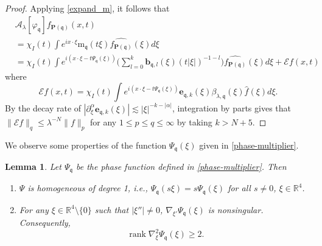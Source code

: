 \documentclass[10pt] %
{amsart}
\theoremstyle{plain}
\newtheorem{lem}[thm]{Lemma}
\numberwithin{equation}{section}
\newcommand{\R}{\mathbb R}
\DeclareMathOperator{\rank}{rank}
\newcommand{\fq}{\mathfrak q}
\begin{document}
\begin{proof}
Applying \eqref{expand_m}, it follows that 
\begin{align*}
&\mathcal A_\lambda[\varphi_{\fq}] f_{\mathbf P(\fq)}(x,t)\\
&=\chi_I(t)  \int e^{i x\cdot \xi} \mathrm m_\fq(t\xi)   \widehat{f_{\mathbf P(\fq)}}(\xi)  d\xi  \\
&=\chi_I(t) \int e^{i (x\cdot \xi - t   \Psi_\fq (\xi) ) }  \Big( \sum_{l=0}^k \mathbf b_{\fq,l}(\xi) (t |\xi|)^{-1-l}    \Big)   \widehat{f_{\mathbf P(\fq)}}(\xi)  d\xi + \mathcal Ef(x,t)
\end{align*}
where
\[
  \mathcal E f (x,t) = \chi_I(t) \int e^{i (x\cdot \xi - t   \Psi_\fq(\xi) ) }    \mathbf e_{\fq,k} (\xi)     \beta_{\lambda,\fq}(\xi) \widehat{f}(\xi)  d\xi  .
 \]
By the decay rate of $|\partial^{\alpha}_\xi\mathbf e_{\fq,k}(\xi)|\lesssim |\xi|^{-k-|\alpha|}$, integration by parts gives that $\|  \mathcal E  f  \|_q \le \lambda^{-N}\| f \|_p$ for any $1 \le p \le q \le \infty$ by taking $k >N+5$.
\end{proof}



We observe some properties of the function $ \Psi_\fq(\xi)$ given in \eqref{phase-multiplier}. 

\begin{lem}\label{rank-hess-2}
Let $\Psi_\fq$ be the phase function defined in \eqref{phase-multiplier}. Then 
\begin{enumerate} 
\item[$($i$\,)$]   $\Psi$ is homogeneous of degree 1, i.e., $\Psi_\fq(s\xi)= s\Psi_\fq(\xi)$ for all $s \neq0$, $\xi\in \R^4$.\vspace{.1cm}
\item[$($ii$\,)$] 
For any $\xi\in \R^4\setminus\{0\}$ such that $|\xi''|\neq 0$, $\nabla_{\xi'}\Psi_\fq (\xi)$ is nonsingular. Consequently, \[\rank  \nabla_{\xi}^2 \Psi_\fq (  \xi) \ge 2.\]
\end{enumerate}
\end{lem}
\end{document}
